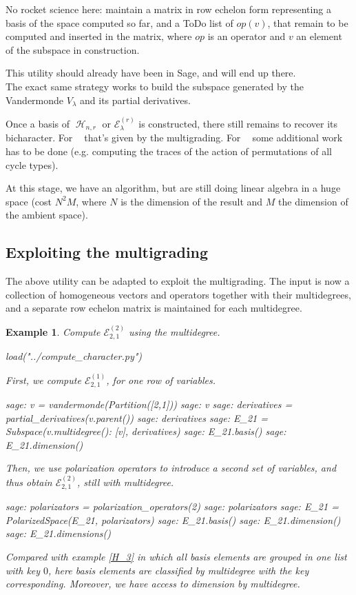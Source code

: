 \documentclass[letter,12pt]{article}
\DeclareMathOperator{\Sn}{\mathbb{S}_n}
\DeclareMathOperator{\GLr}{GL_r}
\DeclareMathOperator{\harmonics}{\mathcal{H}}
\newtheorem{example}{Example}
\begin{document}
	No rocket science here: maintain a matrix in row echelon form representing a basis of the space computed so far, and a ToDo list of $op(v)$, that remain to be computed and inserted in the matrix, where $op$ is an operator and $v$ an element of the subspace in construction.
	
	This utility should already have been in Sage, and will end up there. \\
	
	The exact same strategy works to build the subspace generated by the Vandermonde $V_{\lambda}$ and its partial derivatives. 
	
	Once a basis of $\harmonics_{n,r}$ or $\mathcal{E}_\lambda^{(r)}$ is constructed, there still remains to recover its bicharacter. For $\GLr$ that's given by the multigrading. For $\Sn$ some additional work has to be done (e.g. computing the traces of the action of permutations of all cycle types).
	
	At this stage, we have an algorithm, but are still doing linear algebra in a huge space (cost $N^2 M$, where $N$ is the dimension of the result and $M$ the dimension of the ambient space).
	
	\subsection{Exploiting the multigrading}
	
	The above utility can be adapted to exploit the multigrading. The input is now a collection of homogeneous vectors and operators together with their multidegrees, and a separate row echelon matrix is maintained for each multidegree.
	
	\begin{example} Compute $\mathcal{E}_{2,1}^{(2)}$ using the multidegree. 
		\begin{sagesilent}
			load("../compute_character.py")
		\end{sagesilent}
		First, we compute $\mathcal{E}_{2,1}^{(1)}$, for one row of variables. 
		\begin{sagecommandline}
			sage: v = vandermonde(Partition([2,1]))
			sage: v
			sage: derivatives = partial_derivatives(v.parent())
			sage: derivatives
			sage: E_21 = Subspace({v.multidegree(): [v]}, derivatives)
			sage: E_21.basis()
			sage: E_21.dimension()
		\end{sagecommandline}
		Then, we use polarization operators to introduce a second set of variables, and thus obtain $\mathcal{E}_{2,1}^{(2)}$, still with multidegree. 
		\begin{sagecommandline}
			sage: polarizators = polarization_operators(2)
			sage: polarizators
			sage: E_21 = PolarizedSpace(E_21, polarizators)
			sage: E_21.basis()
			sage: E_21.dimension()
			sage: E_21.dimensions()
		\end{sagecommandline}
		Compared with example \ref{H_3} in which all basis elements are grouped in one list with key $0$, here basis elements are classified by multidegree with the key corresponding. Moreover, we have access to dimension by multidegree. 
	\end{example}
	
\end{document}
